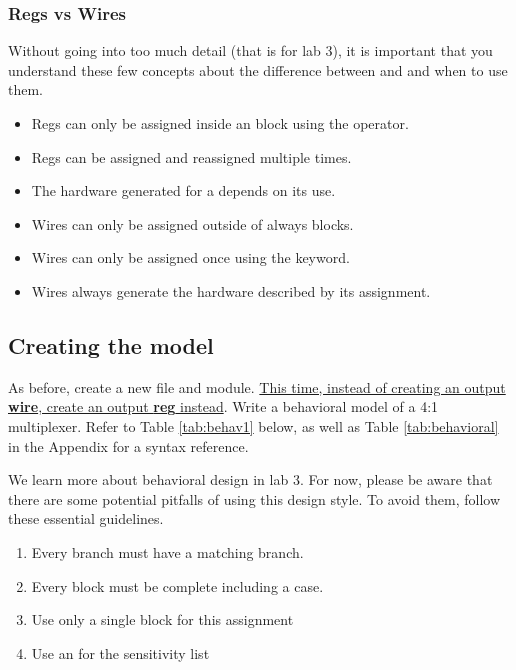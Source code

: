 \documentclass[12pt]{labmanual}
\begin{document}
\subsubsection{Regs vs Wires}
Without going into too much detail (that is for lab 3), it is important that you understand these few concepts about the difference between  and  and when to use them.
\begin{itemize}
    \item Regs can only be assigned inside an  block using the \code{=} operator.
    \item Regs can be assigned and reassigned multiple times.
    \item The hardware generated for a  depends on its use.
    \item Wires can only be assigned outside of always blocks.
    \item Wires can only be assigned once using the  keyword.
    \item Wires always generate the hardware described by its assignment.
\end{itemize}

\subsection{Creating the model}
As before, create a new file and module. \ul{This time, instead of creating an output \textbf{wire}, create an output \textbf{reg} instead}. Write a behavioral model of a 4:1 multiplexer. Refer to Table \ref{tab:behav1} below, as well as Table \vref{tab:behavioral} in the Appendix for a syntax reference.

\begin{important}
We learn more about behavioral design in lab 3. For now, please be aware that there are some potential pitfalls of using this design style. To avoid them, follow these essential guidelines.

\begin{enumerate}
    \item Every  branch must have a matching  branch. 
    \item Every  block must be complete including a  case.
    \item Use only a single  block for this assignment
    \item Use an \code{*} for the sensitivity list
\end{enumerate}
\end{important}
\end{document}
